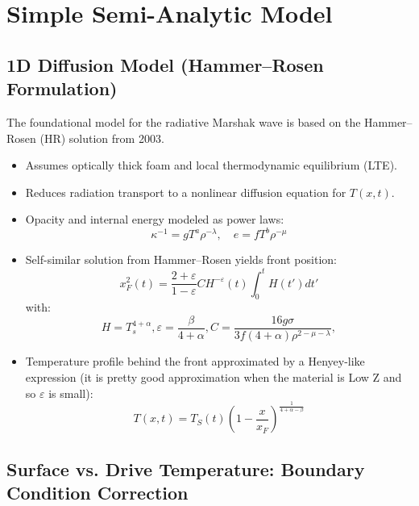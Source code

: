 \documentclass{article}
\begin{document}
\section{Simple Semi-Analytic Model}

\subsection{1D Diffusion Model (Hammer–Rosen Formulation)}
The foundational model for the radiative Marshak wave is based on the Hammer–Rosen (HR) solution from 2003.
\begin{itemize}
    \item Assumes optically thick foam and local thermodynamic equilibrium (LTE).
    \item Reduces radiation transport to a nonlinear diffusion equation for $T(x,t)$.
    \item Opacity and internal energy modeled as power laws:
    \[
    \kappa^{-1} = g T^a \rho^{-\lambda}, \quad e = f T^b \rho^{-\mu}
    \]
    \item Self-similar solution from Hammer–Rosen yields front position:
    \begin{equation}
        x_F^2(t) = \frac{2+\varepsilon}{1-\varepsilon} C H^{-\varepsilon}(t) \int_0^t H(t') dt'
    \end{equation}
    with:
    \begin{equation}
        H = T_s^{4+\alpha}, \varepsilon = \frac{\beta}{4+\alpha}, C = \frac{16g\sigma}{3f(4+\alpha)\rho^{2-\mu-\lambda}},
    \end{equation}
    \item Temperature profile behind the front approximated by a Henyey-like expression (it is pretty good approximation when the material is Low Z and so $\varepsilon$ is small):
    \begin{equation}
        T(x,t) = T_S(t) (1-\frac{x}{x_F})^{\frac{1}{4+\alpha-\beta}}
    \end{equation}
\end{itemize}

\subsection{Surface vs. Drive Temperature: Boundary Condition Correction}
\end{document}
